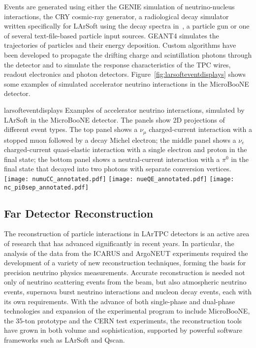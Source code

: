 Events are generated using either the GENIE\cite{GENIE} simulation of
neutrino-nucleus interactions, the
CRY\cite{Cosmic-CRY,Cosmic-CRY-protons,CRY-url} cosmic-ray generator,
a radiological decay simulator written specifically for LArSoft using
the decay spectra in~\cite{docdb-8797}, a particle gun or one of
several text-file-based particle input sources. GEANT4 
simulates the trajectories of particles and their energy
deposition.  Custom algorithms have been developed to propagate the
drifting charge and scintillation photons through the detector and to
simulate the response characteristics of the TPC wires, readout
electronics and photon detectors.
Figure~\ref{fig:larsofteventdisplays} shows some examples of simulated
accelerator neutrino interactions in the MicroBooNE detector.
\begin{cdrfigure}{larsofteventdisplays}
{Examples of accelerator neutrino interactions, simulated by LArSoft
  in the MicroBooNE detector. The panels show 2D projections of
  different event types.  The top panel shows a $\nu_{\mu}$
  charged-current interaction with a stopped muon followed by a decay
  Michel electron; the middle panel shows a $\nu_{e}$ charged-current
  quasi-elastic interaction with a single electron and proton in the
  final state; the bottom panel shows a neutral-current interaction
  with a $\pi^{0}$ in the final state that decayed into two photons
  with separate conversion vertices.}
\texttt{[image: numuCC\_annotated.pdf]}
\texttt{[image: nueQE\_annotated.pdf]}
\texttt{[image: nc\_pi0sep\_annotated.pdf]}
\end{cdrfigure}

\subsection{Far Detector Reconstruction}
\label{sec:detectors-sc-physics-software-reconstruction-fd}

The reconstruction of particle interactions in LArTPC detectors is an
active area of research that has advanced significantly in recent
years.  In particular, the analysis of the data from the
ICARUS\cite{Amerio:2004ze,icarus-url,ICARUS-pizero,Antonello:2012hu}
and ArgoNEUT
experiments\cite{Adamson:2013/02/28tla,argoneut-url,Acciarri:2013met}
required the development of a variety of new reconstruction
techniques, forming the basis for precision neutrino physics
measurements.  Accurate reconstruction is needed not only of neutrino
scattering events from the beam, but also atmospheric neutrino events,
supernova burst neutrino interactions and nucleon decay events, each
with its own requirements.  With the advance of both single-phase and
dual-phase technologies and expansion of the experimental program to
include MicroBooNE\cite{Chen:2007ae,microboone-url}, the 35-ton
prototype and the CERN test experiments, the reconstruction tools have
grown in both volume and sophistication, supported by powerful
software frameworks such as LArSoft and Qscan.

